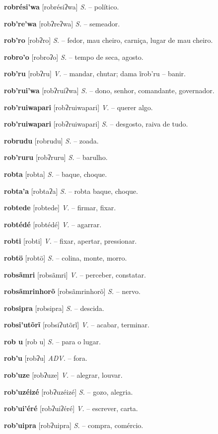 \textbf{robrési'wa} [robrésiʔwa] \textit{S.} -- político.

\textbf{rob're'wa} [robʔreʔwa] \textit{S.} -- semeador.

\textbf{rob'ro} [robʔro] \textit{S.} -- fedor, mau cheiro, carniça, lugar de mau cheiro.

\textbf{robro'o} [robroʔo] \textit{S.} -- tempo de seca, agosto.

\textbf{rob'ru} [robʔru] \textit{V.} -- mandar, chutar; dama ĩrob'ru -- banir.

\textbf{rob'rui'wa} [robʔruiʔwa] \textit{S.} -- dono, senhor, comandante, governador.

\textbf{rob'ruiwapari} [robʔruiwapari] \textit{V.} -- querer algo.

\textbf{rob'ruiwapari} [robʔruiwapari] \textit{S.} -- desgosto, raiva de tudo.

\textbf{robrudu} [robrudu] \textit{S.} -- zoada.

\textbf{rob'ruru} [robʔruru] \textit{S.} -- barulho.

\textbf{robta} [robta] \textit{S.} -- baque, choque.

\textbf{robta'a} [robtaʔa] \textit{S.} -- robta baque, choque.

\textbf{robtede} [robtede] \textit{V.} -- firmar, fixar.

\textbf{robtédé} [robtédé] \textit{V.} -- agarrar.

\textbf{robti} [robti] \textit{V.} -- fixar, apertar, pressionar.

\textbf{robtö} [robtö] \textit{S.} -- colina, monte, morro.

\textbf{robsãmri} [robsãmri] \textit{V.} -- perceber, constatar.

\textbf{robsãmrinhorõ} [robsãmrinhorõ] \textit{S.} -- nervo.

\textbf{robsipra} [robsipra] \textit{S.} -- descida.

\textbf{robsi'utõrĩ} [robsiʔutõrĩ] \textit{V.} -- acabar, terminar.

\textbf{rob u} [rob u] \textit{S.} -- para o lugar.

\textbf{rob'u} [robʔu] \textit{ADV.} -- fora.

\textbf{rob'uze} [robʔuze] \textit{V.} -- alegrar, louvar.

\textbf{rob'uzéizé} [robʔuzéizé] \textit{S.} -- gozo, alegria.

\textbf{rob'ui'éré} [robʔuiʔéré] \textit{V.} -- escrever, carta.

\textbf{rob'uipra} [robʔuipra] \textit{S.} -- compra, comércio.

